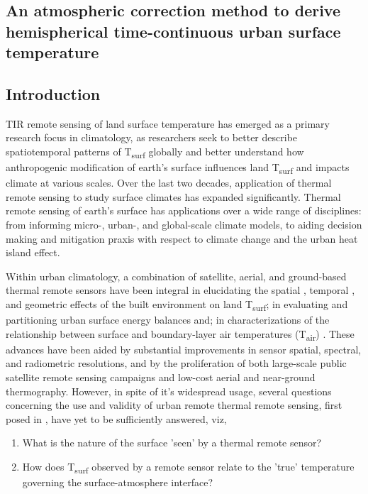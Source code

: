 \begin{bibunit}

\rhead{\thepage}

\chapter{An atmospheric correction method to derive hemispherical time-continuous urban surface temperature}\label{paper1}

\section{Introduction}

TIR remote sensing of land surface temperature has emerged as a primary research focus in climatology, as researchers seek to better describe spatiotemporal patterns of T\textsubscript{surf} globally and better understand how anthropogenic modification of earth's surface influences land T\textsubscript{surf} and impacts climate at various scales. Over the last two decades, application of thermal remote sensing to study surface climates has expanded significantly. Thermal remote sensing of earth's surface has applications over a wide range of disciplines: from informing micro-, urban-, and global-scale climate models, to aiding decision making and mitigation praxis with respect to climate change and the urban heat island effect. 

Within urban climatology, a combination of satellite, aerial, and ground-based thermal remote sensors have been integral in elucidating the spatial \citep{Roth1989}, temporal \citep{Peng2012}, and geometric \citep{Voogt1997} effects of the built environment on land T\textsubscript{surf}; in evaluating and partitioning urban surface energy balances \citep{BastiaanssenW.G.M.1998, Yamaguchi2005,Frey2007} and; in characterizations of the relationship between surface and boundary-layer air temperatures (T\textsubscript{air}) \citep{Stoll1992}. These advances have been aided by substantial improvements in sensor spatial, spectral, and radiometric resolutions, and by the proliferation of both large-scale public satellite remote sensing campaigns and low-cost aerial and near-ground thermography. However, in spite of it's widespread usage, several questions concerning the use and validity of urban remote thermal remote sensing, first posed in \citet{Roth1989}, have yet to be sufficiently answered, viz,

\begin{enumerate}
	\item What is the nature of the surface 'seen' by a thermal remote sensor?
	\item How does T\textsubscript{surf} observed by a remote sensor relate to the 'true' temperature governing the surface-atmosphere interface?
\end{enumerate}


\end{bibunit}
